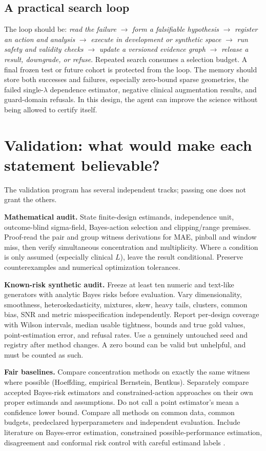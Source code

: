 \documentclass[11pt]{article}
\begin{document}
\subsection{A practical search loop}
The loop should be: \emph{read the failure} $\rightarrow$ \emph{form a falsifiable hypothesis} $\rightarrow$ \emph{register an action and analysis} $\rightarrow$ \emph{execute in development or synthetic space} $\rightarrow$ \emph{run safety and validity checks} $\rightarrow$ \emph{update a versioned evidence graph} $\rightarrow$ \emph{release a result, downgrade, or refuse}. Repeated search consumes a selection budget. A final frozen test or future cohort is protected from the loop. The memory should store both successes and failures, especially zero-bound sparse geometries, the failed single-$\lambda$ dependence estimator, negative clinical augmentation results, and guard-domain refusals. In this design, the agent can improve the science without being allowed to certify itself.

\section{Validation: what would make each statement believable?}
The validation program has several independent tracks; passing one does not grant the others.

\textbf{Mathematical audit.} State finite-design estimands, independence unit, outcome-blind sigma-field, Bayes-action selection and clipping/range premises. Proof-read the pair and group witness derivations for MAE, pinball and window miss, then verify simultaneous concentration and multiplicity. Where a condition is only assumed (especially clinical $L$), leave the result conditional. Preserve counterexamples and numerical optimization tolerances.

\textbf{Known-risk synthetic audit.} Freeze at least ten numeric and text-like generators with analytic Bayes risks before evaluation. Vary dimensionality, smoothness, heteroskedasticity, mixtures, skew, heavy tails, clusters, common bias, SNR and metric misspecification independently. Report per-design coverage with Wilson intervals, median usable tightness, bounds and true gold values, point-estimation error, and refusal rates. Use a genuinely untouched seed and registry after method changes. A zero bound can be valid but unhelpful, and must be counted as such.

\textbf{Fair baselines.} Compare concentration methods on exactly the same witness where possible (Hoeffding, empirical Bernstein, Bentkus). Separately compare accepted Bayes-risk estimators and constrained-action approaches on their own proper estimands and assumptions. Do not call a point estimator's mean a confidence lower bound. Compare all methods on common data, common budgets, predeclared hyperparameters and independent evaluation. Include literature on Bayes-error estimation, constrained possible-performance estimation, disagreement and conformal risk control with careful estimand labels \cite{anderson,bazinet,eaton,bentkus,crc}.
\end{document}
